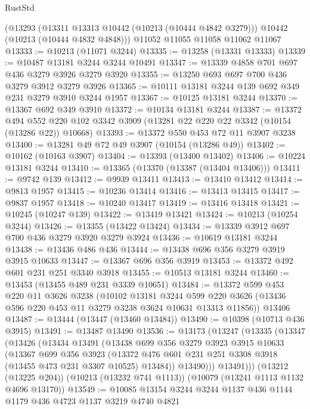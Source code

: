 \begin{lexlean}{RustStd}
\begin{coremodule}
{\begin{coremodule}
{{{{{{{{{{{{{{{{{{{{{{{{{{    (@13293
      (@13311 @13313 @10442 (@10213 (@10444 @4842 @3279)))
      @10442
      (@10213 (@10444 @4832 @4848)))
    @11052
    @11055
    @11058
    @11062
    @11067
@13333 := @10213 (@11071 @3244)
@13335 := @13258 (@13331 @13333)
@13339 := @10487 @13181 @3244 @3244 @10491
@13347 := @13339 @4858 @701 @697 @436 @3279 @3926 @3279 @3920
@13355 := @13250 @693 @697 @700 @436 @3279 @3912 @3279 @3926
@13365 := @10111 @13181 @3244 @139 @692 @349 @231 @3279 @3910 @3244 @1957
@13367 := @10125 @13181 @3244
@13370 := @13367 @692 @349 @3910
@13372 := @10134 @13181 @3244
@13387 := @13372
    @494
    @552
    @220
    @102
    @3342
    @3909
    (@13281 @22 @220 @22 @3342 (@10154 (@13286 @22)) @10668)
@13393 := @13372 @550 @453 @72 @11 @3907 @3238
@13400 := @13281 @49 @72 @49 @3907 (@10154 (@13286 @49))
@13402 := @10162 (@10163 @3907)
@13404 := @13393 (@13400 @13402)
@13406 := @10224 @13181 @3244
@13410 := @13365 (@13370 (@13387 (@13404 @13406)))
@13411 := @9742 @139
@13412 := @9939 @13411
@13413 := @13410 @13412
@13414 := @9813 @1957
@13415 := @10236 @13414
@13416 := @13413 @13415
@13417 := @9837 @1957
@13418 := @10240 @13417
@13419 := @13416 @13418
@13421 := @10245 (@10247 @139)
@13422 := @13419 @13421
@13424 := @10213 (@10254 @3244)
@13426 := @13355 (@13422 @13424)
@13434 := @13339 @3912 @697 @700 @436 @3279 @3920 @3279 @3924
@13436 := @10619 @13181 @3244
@13438 := @13436 @486 @436
@13444 := @13438 @696 @356 @3279 @3919 @3915 @10633
@13447 := @13367 @696 @356 @3919
@13453 := @13372 @492 @601 @231 @251 @3340 @3918
@13455 := @10513 @13181 @3244
@13460 := @13453 (@13455 @489 @231 @3339 @10651)
@13484 := @13372
    @599
    @453
    @220
    @11
    @3626
    @3238
    (@10102
      @13181
      @3244
      @599
      @220
      @3626
      (@13436 @596 @220 @453 @11 @3279 @3238 @3624 @10631 @13313 @11856))
    @13406
@13487 := @13444 (@13447 (@13460 @13484))
@13490 := @10398 (@10713 @436 @3915)
@13491 := @13487 @13490
@13536 := @13173
    (@13247
      (@13335
        (@13347
          (@13426
            (@13434
              @13491
              (@13438
                @699
                @356
                @3279
                @3923
                @3915
                @10633
                (@13367
                  @699
                  @356
                  @3923
                  (@13372 @476 @601 @231 @251 @3308 @3918 (@13455 @473 @231 @3307 @10525) @13484))
                @13490)))
          @13491)))
    (@13212 (@13225 @204))
    (@10213 (@13232 @741 @1113))
    (@10079 (@13241 @1113 @1132 @4696 @13170))
@13549 := @10085 @13154 @3244 @3244 @1137 @436 @1144 @1179 @436 @4723 @1137 @3219 @4740 @4821
}}}}}}}}}}}}}}}}}}}}}}}}}}
\end{coremodule}}
\end{coremodule}
\end{lexlean}

